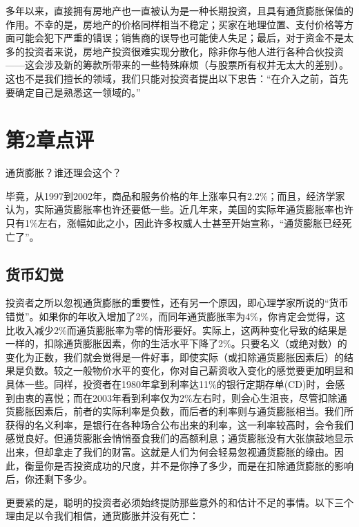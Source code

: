\documentclass[12pt,oneside]{book}
\begin{document}
多年以来，直接拥有房地产也一直被认为是一种长期投资，且具有通货膨胀保值的作用。不幸的是，房地产的价格同样相当不稳定；买家在地理位置、支付价格等方面可能会犯下严重的错误；销售商的误导也可能使人失足；最后，对于资金不是太多的投资者来说，房地产投资很难实现分散化，除非你与他人进行各种合伙投资——这会涉及新的筹款所带来的一些特殊麻烦（与股票所有权并无太大的差别）。这也不是我们擅长的领域，我们只能对投资者提出以下忠告：“在介入之前，首先要确定自己是熟悉这一领域的。”


\section{第2章点评}
通货膨胀？谁还理会这个？

毕竟，从1997到2002年，商品和服务价格的年上涨率只有2.2\%；而且，经济学家认为，实际通货膨胀率也许还要低一些。近几年来，美国的实际年通货膨胀率也许只有1\%左右，涨幅如此之小，因此许多权威人士甚至开始宣称，“通货膨胀已经死亡了”。

\subsection{货币幻觉}
投资者之所以忽视通货膨胀的重要性，还有另一个原因，即心理学家所说的“货币错觉”。如果你的年收入增加了2\%，而同年通货膨胀率为4\%，你肯定会觉得，这比收入减少2\%而通货膨胀率为零的情形要好。实际上，这两种变化导致的结果是一样的，扣除通货膨胀因素，你的生活水平下降了2\%。只要名义（或绝对数）的变化为正数，我们就会觉得是一件好事，即使实际（或扣除通货膨胀因素后）的结果是负数。较之一般物价水平的变化，你对自己薪资收入变化的感觉要更加明显和具体一些。同样，投资者在1980年拿到利率达11\%的银行定期存单(CD)时，会感到由衷的喜悦；而在2003年看到利率仅为2\%左右时，则会心生沮丧，尽管扣除通货膨胀因素后，前者的实际利率是负数，而后者的利率则与通货膨胀相当。我们所获得的名义利率，是银行在各种场合公布出来的利率，这一利率较高时，会令我们感觉良好。但通货膨胀会悄悄蚕食我们的高额利息；通货膨胀没有大张旗鼓地显示出来，但却拿走了我们的财富。这就是人们为何会轻易忽视通货膨胀的缘由。因此，衡量你是否投资成功的尺度，并不是你挣了多少，而是在扣除通货膨胀的影响后，你还剩下多少。

更要紧的是，聪明的投资者必须始终提防那些意外的和估计不足的事情。以下三个理由足以令我们相信，通货膨胀并没有死亡：
\end{document}
